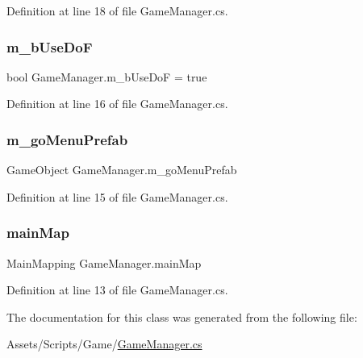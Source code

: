 Definition at line 18 of file Game\+Manager.\+cs.

\mbox{\label{class_game_manager_a5f44a085c580d46869d434c58356acaf}} 
\subsubsection{\texorpdfstring{m\+\_\+b\+Use\+DoF}{m\_bUseDoF}}
{\footnotesize\ttfamily bool Game\+Manager.\+m\+\_\+b\+Use\+DoF = true}



Definition at line 16 of file Game\+Manager.\+cs.

\mbox{\label{class_game_manager_a5f2e8fddfab1df9b614ee8c19e190c89}} 
\subsubsection{\texorpdfstring{m\+\_\+go\+Menu\+Prefab}{m\_goMenuPrefab}}
{\footnotesize\ttfamily Game\+Object Game\+Manager.\+m\+\_\+go\+Menu\+Prefab}



Definition at line 15 of file Game\+Manager.\+cs.

\mbox{\label{class_game_manager_ad6ae4c20fbf43657dfb819caf38df783}} 
\subsubsection{\texorpdfstring{main\+Map}{mainMap}}
{\footnotesize\ttfamily Main\+Mapping Game\+Manager.\+main\+Map\hspace{0.3cm}{\ttfamily [static]}}



Definition at line 13 of file Game\+Manager.\+cs.



The documentation for this class was generated from the following file\+:\begin{DoxyCompactItemize}
\item 
Assets/\+Scripts/\+Game/\mbox{\hyperlink{_game_manager_8cs}{Game\+Manager.\+cs}}\end{DoxyCompactItemize}
